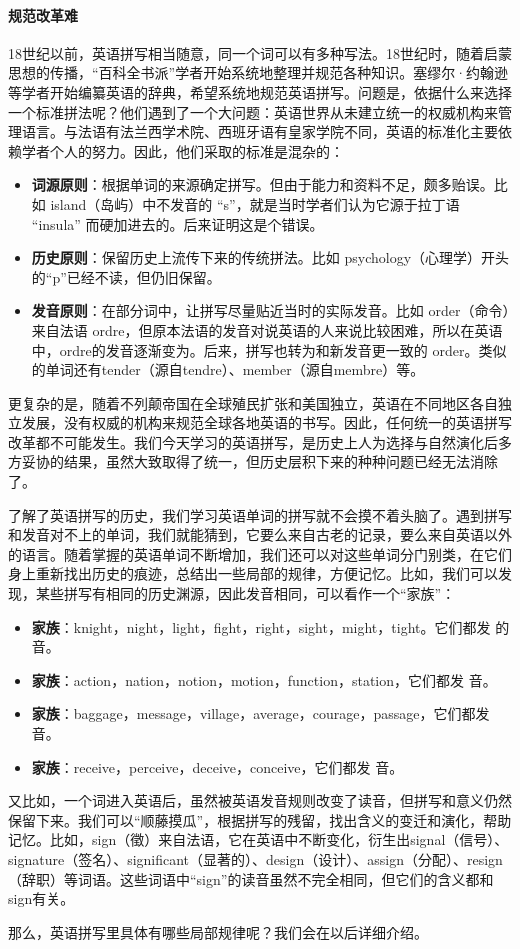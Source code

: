 \documentclass[10.5pt, a4paper]{ctexbook} %
\begin{document}
\subsubsection*{规范改革难}

18世纪以前，英语拼写相当随意，同一个词可以有多种写法。18世纪时，随着启蒙思想的传播，“百科全书派”学者开始系统地整理并规范各种知识。塞缪尔·约翰逊等学者开始编纂英语的辞典，希望系统地规范英语拼写。问题是，依据什么来选择一个标准拼法呢？他们遇到了一个大问题：英语世界从未建立统一的权威机构来管理语言。与法语有法兰西学术院、西班牙语有皇家学院不同，英语的标准化主要依赖学者个人的努力。因此，他们采取的标准是混杂的：
\begin{itemize}
    \item \textbf{词源原则}：根据单词的来源确定拼写。但由于能力和资料不足，颇多贻误。比如 island（岛屿）中不发音的 “s”，就是当时学者们认为它源于拉丁语 “insula” 而硬加进去的。后来证明这是个错误。
    \item \textbf{历史原则}：保留历史上流传下来的传统拼法。比如 psychology（心理学）开头的“p”已经不读，但仍旧保留。
    \item \textbf{发音原则}：在部分词中，让拼写尽量贴近当时的实际发音。比如 order（命令）来自法语 ordre，但原本法语的发音对说英语的人来说比较困难，所以在英语中，ordre的发音逐渐变为。后来，拼写也转为和新发音更一致的 order。类似的单词还有tender（源自tendre）、member（源自membre）等。
\end{itemize}

更复杂的是，随着不列颠帝国在全球殖民扩张和美国独立，英语在不同地区各自独立发展，没有权威的机构来规范全球各地英语的书写。因此，任何统一的英语拼写改革都不可能发生。我们今天学习的英语拼写，是历史上人为选择与自然演化后多方妥协的结果，虽然大致取得了统一，但历史层积下来的种种问题已经无法消除了。

了解了英语拼写的历史，我们学习英语单词的拼写就不会摸不着头脑了。遇到拼写和发音对不上的单词，我们就能猜到，它要么来自古老的记录，要么来自英语以外的语言。随着掌握的英语单词不断增加，我们还可以对这些单词分门别类，在它们身上重新找出历史的痕迹，总结出一些局部的规律，方便记忆。比如，我们可以发现，某些拼写有相同的历史渊源，因此发音相同，可以看作一个“家族”：
\begin{itemize}
    \item {} \textbf{家族}：knight，night，light，fight，right，sight，might，tight。它们都发  的音。
    \item {} \textbf{家族}：action，nation，notion，motion，function，station，它们都发 音。
    \item {} \textbf{家族}：baggage，message，village，average，courage，passage，它们都发 音。
    \item {} \textbf{家族}：receive，perceive，deceive，conceive，它们都发 音。
\end{itemize}

又比如，一个词进入英语后，虽然被英语发音规则改变了读音，但拼写和意义仍然保留下来。我们可以“顺藤摸瓜”，根据拼写的残留，找出含义的变迁和演化，帮助记忆。比如，sign（徵）来自法语，它在英语中不断变化，衍生出signal（信号）、signature（签名）、significant（显著的）、design（设计）、assign（分配）、resign（辞职）等词语。这些词语中“sign”的读音虽然不完全相同，但它们的含义都和sign有关。

那么，英语拼写里具体有哪些局部规律呢？我们会在以后详细介绍。

\chapter{}
\end{document}
